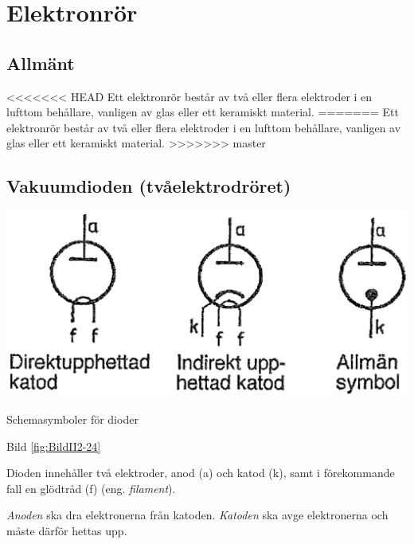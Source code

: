 \section{Elektronrör}
\label{elektronrör}

\subsection{Allmänt}

<<<<<<< HEAD
Ett elektronrör består av två eller flera elektroder i en lufttom
behållare, vanligen av glas eller ett keramiskt material.
=======
Ett elektronrör består av två eller flera elektroder i en lufttom behållare,
vanligen av glas eller ett keramiskt material.
>>>>>>> master

\subsection{Vakuumdioden (tvåelektrodröret)}
\label{vakuumdioden}

\begin{marginfigure}%
\includegraphics[width=\textwidth]{images/cropped_pdfs/bild_2_2-24.pdf}
\caption{Schemasymboler för dioder}
\label{fig:BildII2-24}
\end{marginfigure}

Bild \ref{fig:BildII2-24}

Dioden innehåller två elektroder, anod (a) och katod (k), samt i förekommande
fall en glödtråd (f) (eng. \emph{filament}).

\emph{Anoden} ska dra elektronerna från katoden.
\emph{Katoden} ska avge elektronerna och måste därför hettas upp.

